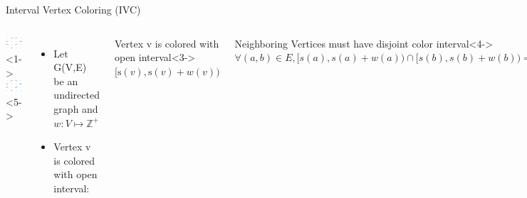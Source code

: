 \begin{frame}{Interval Vertex Coloring (IVC)}
  \begin{columns}
        \includegraphics[width=1\textwidth]{figures/ICV0.pdf}<1->
        \includegraphics[width=1\textwidth]{figures/ICV1.pdf}<5->
    \begin{itemize}
    \item<1-> Let G(V,E) be an undirected graph and $w : V \mapsto \mathbb{Z^+}$
    \item<2-> Vertex v is colored with open interval:
    \end{itemize}
    \begin{block}{Vertex v is colored with open interval}<3->
      $[\text{s}(v), \text{s}(v)+w(v))$
    \end{block}
    \begin{block}{Neighboring Vertices must have disjoint color interval}<4->
      $\forall (a, b) \in E, [s(a), s(a) + w(a)) \cap [s(b), s(b) + w(b)) = \emptyset.$
    \end{block}    
  \end{columns}
\end{frame}

